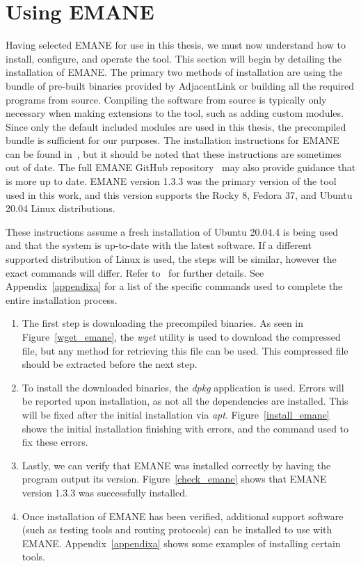\section{Using EMANE}
Having selected EMANE for use in this thesis, we must now understand how to install, configure, and operate the tool.
This section will begin by detailing the installation of EMANE.
The primary two methods of installation are using the bundle of pre-built binaries provided by AdjacentLink or building all the required programs from source.
Compiling the software from source is typically only necessary when making extensions to the tool, such as adding custom modules.
Since only the default included modules are used in this thesis, the precompiled bundle is sufficient for our purposes.
The installation instructions for EMANE can be found in~\cite{emane_tutorial}, but it should be noted that these instructions are sometimes out of date.
The full EMANE GitHub repository~\cite{emane_git} may also provide guidance that is more up to date.
EMANE version 1.3.3 was the primary version of the tool used in this work, and this version supports the Rocky 8, Fedora 37, and Ubuntu 20.04 Linux distributions.\par
These instructions assume a fresh installation of Ubuntu 20.04.4 is being used and that the system is up-to-date with the latest software.
If a different supported distribution of Linux is used, the steps will be similar, however the exact commands will differ. Refer to~\cite{emane_tutorial,emane_git} for further details.
See Appendix~\ref{appendixa} for a list of the specific commands used to complete the entire installation process.
\begin{enumerate}
    \item The first step is downloading the precompiled binaries. As seen in Figure~\ref{wget_emane}, the \textit{wget} utility is used to download the compressed file, but any method for retrieving this file can be used. This compressed file should be extracted before the next step.
    \item To install the downloaded binaries, the \textit{dpkg} application is used. Errors will be reported upon installation, as not all the dependencies are installed. This will be fixed after the initial installation via \textit{apt}. Figure~\ref{install_emane} shows the initial installation finishing with errors, and the command used to fix these errors.
    \item Lastly, we can verify that EMANE was installed correctly by having the program output its version. Figure~\ref{check_emane} shows that EMANE version 1.3.3 was successfully installed.
    \item Once installation of EMANE has been verified, additional support software (such as testing tools and routing protocols) can be installed to use with EMANE. Appendix~\ref{appendixa} shows some examples of installing certain tools.
\end{enumerate}


